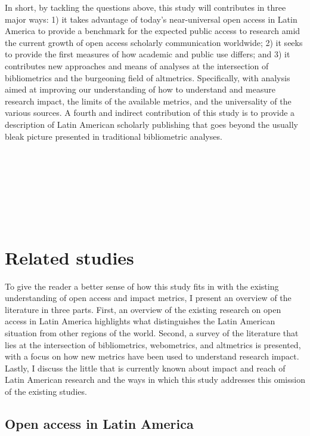 In short, by tackling the questions above, this study will contributes in three major ways: 1) it takes advantage of today's near-universal open access in Latin America to provide a benchmark for the expected public access to research amid the current growth of open access scholarly communication worldwide; 2) it seeks to provide the first measures of how academic and public use differs; and 3) it contributes new approaches and means of analyses at the intersection of bibliometrics and the burgeoning field of altmetrics. Specifically, with analysis aimed at improving our understanding of how to understand and measure research impact, the limits of the available metrics, and the universality of the various sources. A fourth and indirect contribution of this study is to provide a description of Latin American scholarly publishing that goes beyond the usually bleak picture presented in traditional bibliometric analyses.

~\nocite{Hitchcock2013}

~\nocite{Smith1998}

~\nocite{BaileyJr2005}

~\nocite{baileyjr2013}

\chapter{Related studies}
\label{relatedstudies}

To give the reader a better sense of how this study fits in with the existing understanding of open access and impact metrics, I present an overview of the literature in three parts. First, an overview of the existing research on open access in Latin America highlights what distinguishes the Latin American situation from other regions of the world. Second, a survey of the literature that lies at the intersection of bibliometrics, webometrics, and altmetrics is presented, with a focus on how new metrics have been used to understand research impact. Lastly, I discuss the little that is currently known about impact and reach of Latin American research and the ways in which this study addresses this omission of the existing studies.

\section{Open access in Latin America}
\label{openaccessinlatinamerica}

